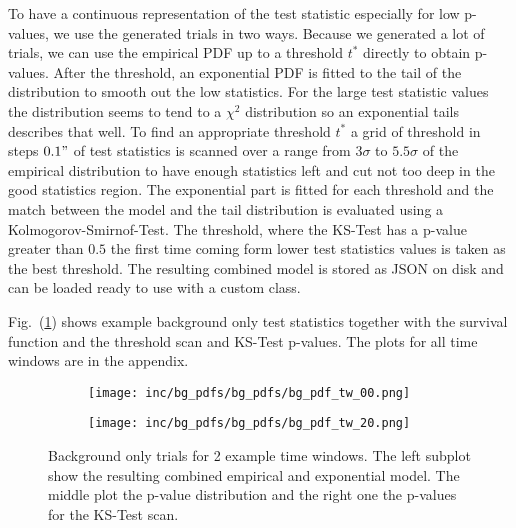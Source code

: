 To have a continuous representation of the test statistic especially for low p-values, we use the generated trials in two ways.
Because we generated a lot of trials, we can use the empirical PDF up to a threshold $t^*$ directly to obtain p-values.
After the threshold, an exponential PDF is fitted to the tail of the distribution to smooth out the low statistics.
For the large test statistic values the distribution seems to tend to a $\chi^2$ distribution so an exponential tails describes that well.
To find an appropriate threshold $t^*$ a grid of threshold in steps $0.1"$ of test statistics is scanned over a range from $3\sigma$ to $5.5\sigma$ of the empirical distribution to have enough statistics left and cut not too deep in the good statistics region.
The exponential part is fitted for each threshold and the match between the model and the tail distribution is evaluated using a Kolmogorov-Smirnof-Test.
The threshold, where the KS-Test has a p-value greater than $0.5$ the first time coming form lower test statistics values is taken as the best threshold.
The resulting combined model is stored as JSON on disk and can be loaded ready to use with a custom class.

Fig.~(\ref{fig:bg_ts_models}) shows example background only test statistics together with the survival function and the threshold scan and KS-Test p-values.
The plots for all time windows are in the appendix.

\begin{figure}[htbp]
  \centering
  \begin{subfigure}[c]{\textwidth}
    \texttt{[image: inc/bg\_pdfs/bg\_pdfs/bg\_pdf\_tw\_00.png]}
  \end{subfigure}
  \begin{subfigure}[c]{\textwidth}
    \texttt{[image: inc/bg\_pdfs/bg\_pdfs/bg\_pdf\_tw\_20.png]}
  \end{subfigure}
  \caption{Background only trials for 2 example time windows. The left subplot show the resulting combined empirical and exponential model. The middle plot the p-value distribution and the right one the p-values for the KS-Test scan.}
  \label{fig:bg_ts_models}
\end{figure}


